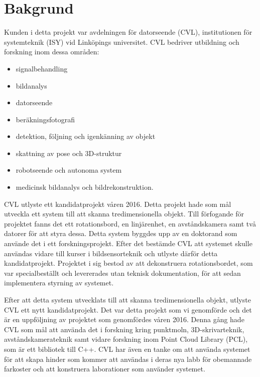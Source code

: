 \chapter{Bakgrund}
\label{cha:background}


Kunden i detta projekt var avdelningen för datorseende (CVL), institutionen för systemteknik (ISY) vid Linköpings universitet. CVL bedriver utbildning och forskning inom dessa områden:
\begin{itemize}
	\item signalbehandling
	\item bildanalys
	\item datorseende
	\item beräkningsfotografi
	\item detektion, följning och igenkänning av objekt
	\item skattning av pose och 3D-struktur
	\item robotseende och autonoma system
	\item medicinsk bildanalys och bildrekonstruktion.
\end{itemize}

CVL utlyste ett kandidatprojekt våren 2016. Detta projekt hade som mål utveckla ett system till att skanna tredimensionella objekt. Till förfogande för projektet fanns det ett rotationsbord, en linjärenhet, en avståndskamera samt två datorer för att styra dessa. Detta system byggdes upp av en doktorand som använde det i ett forskningsprojekt. Efter det bestämde CVL att systemet skulle användas vidare till kurser i bildsensorteknik och utlyste därför detta kandidatprojekt. Projektet i sig bestod av att dekonstruera rotationsbordet, som var specialbeställt och levererades utan teknisk dokumentation, för att sedan implementera styrning av systemet. 

Efter att detta system utvecklats till att skanna tredimensionella objekt, utlyste CVL ett nytt kandidatprojekt. Det var detta projekt som vi genomförde och det är en uppföljning av projektet som genomfördes våren 2016. Denna gång hade CVL som mål att använda det i forskning kring punktmoln, 3D-skrivarteknik, avståndskamerateknik samt vidare forskning inom Point Cloud Library (PCL), som är ett bibliotek till C++. CVL har även en tanke om att använda systemet för att skapa hinder som kommer att användas i deras nya labb för obemannade farkoster och att konstruera laborationer som använder systemet. 

